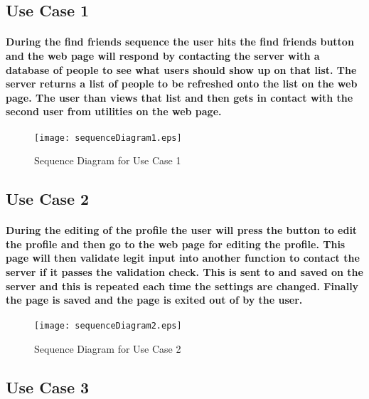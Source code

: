 \documentclass[12pt]{article}
\begin{document}
  \subsection{\bf Use Case 1}
      \paragraph{\normalfont \indent During the find friends sequence the user hits the find friends button and the web page will respond by contacting the server with a database of people to see what users should show up on that list. The server returns a list of people to be refreshed onto the list on the web page. The user than views that list and then gets in contact with the second user from utilities on the web page.
      }

      \begin{figure}[H]
              \texttt{[image: sequenceDiagram1.eps]}
                \caption{Sequence Diagram for Use Case 1}
                \label{fig: Sequence Diagram 1}
      \end{figure}

  \newpage
  \subsection{\bf Use Case 2}
      \paragraph{\normalfont \indent During the editing of the profile the user will press the button to edit the profile and then go to the web page for editing the profile. This page will then validate legit input into another function to contact the server if it passes the validation check. This is sent to and saved on the server and this is repeated each time the settings are changed. Finally the page is saved and the page is exited out of by the user.
      }

      \begin{figure}[H]
              \texttt{[image: sequenceDiagram2.eps]}
              \caption{Sequence Diagram for Use Case 2}
              \label{fig: Sequence Diagram 2}
      \end{figure}

  \newpage
  \subsection{\bf Use Case 3}
\end{document}
